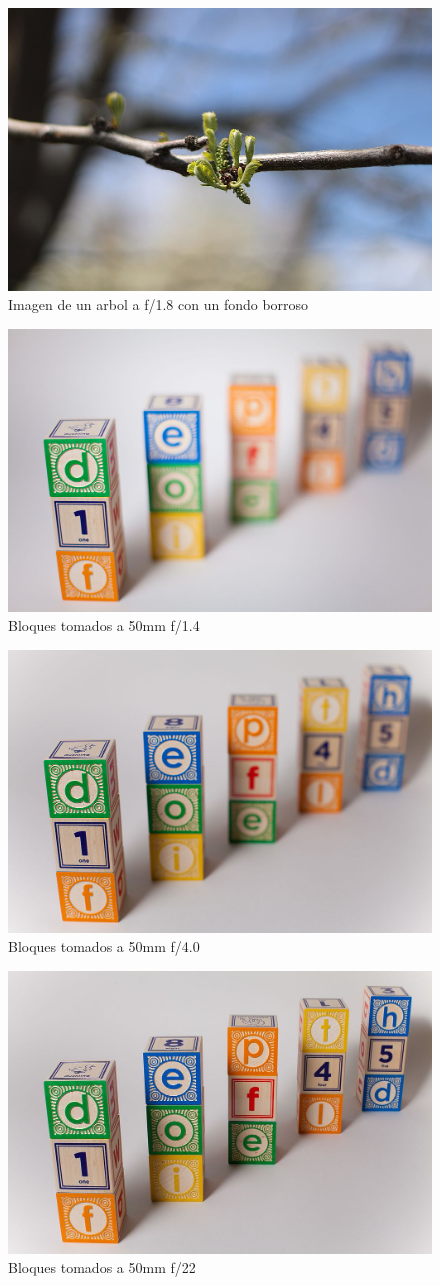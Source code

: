 \documentclass{article}
\begin{document}
\begin{figure}[H]
	\centering
	\includegraphics[width=0.75\linewidth]{Figuras/DOF_2}
	\caption{Imagen de un arbol a f/1.8 con un fondo borroso}
	\label{fig:dof2}
\end{figure}

\begin{figure}[H]
	\centering
	\includegraphics[width=0.60\linewidth]{Figuras/DOF_3}
	\caption{Bloques tomados a 50mm f/1.4}
	\label{fig:dof3}
\end{figure}

\begin{figure}[H]
	\centering
	\includegraphics[width=0.60\linewidth]{Figuras/DOF_4}
	\caption{Bloques tomados a 50mm f/4.0}
	\label{fig:dof4}
\end{figure}

\begin{figure}[H]
	\centering
	\includegraphics[width=0.60\linewidth]{Figuras/DOF_5}
	\caption{Bloques tomados a 50mm f/22}
	\label{fig:dof5}
\end{figure}
\end{document}
